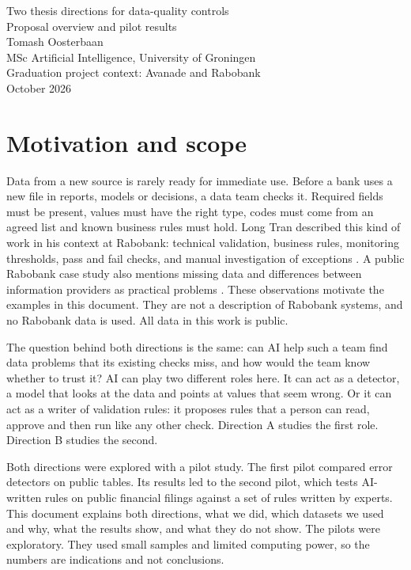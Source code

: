 \documentclass[11pt,a4paper]{article}
\begin{document}
\begin{center}
{\Large Two thesis directions for data-quality controls}\\[0.4em]
{\large Proposal overview and pilot results}\\[0.8em]
Tomash Oosterbaan\\
MSc Artificial Intelligence, University of Groningen\\
Graduation project context: Avanade and Rabobank\\
October 2026
\end{center}

\section{Motivation and scope}

Data from a new source is rarely ready for immediate use. Before a bank uses a new file in reports, models or decisions, a data team checks it. Required fields must be present, values must have the right type, codes must come from an agreed list and known business rules must hold. Long Tran described this kind of work in his context at Rabobank: technical validation, business rules, monitoring thresholds, pass and fail checks, and manual investigation of exceptions \cite{tran}. A public Rabobank case study also mentions missing data and differences between information providers as practical problems \cite{alderse}. These observations motivate the examples in this document. They are not a description of Rabobank systems, and no Rabobank data is used. All data in this work is public.

The question behind both directions is the same: can AI help such a team find data problems that its existing checks miss, and how would the team know whether to trust it? AI can play two different roles here. It can act as a detector, a model that looks at the data and points at values that seem wrong. Or it can act as a writer of validation rules: it proposes rules that a person can read, approve and then run like any other check. Direction A studies the first role. Direction B studies the second.

Both directions were explored with a pilot study. The first pilot compared error detectors on public tables. Its results led to the second pilot, which tests AI-written rules on public financial filings against a set of rules written by experts. This document explains both directions, what we did, which datasets we used and why, what the results show, and what they do not show. The pilots were exploratory. They used small samples and limited computing power, so the numbers are indications and not conclusions.
\end{document}
